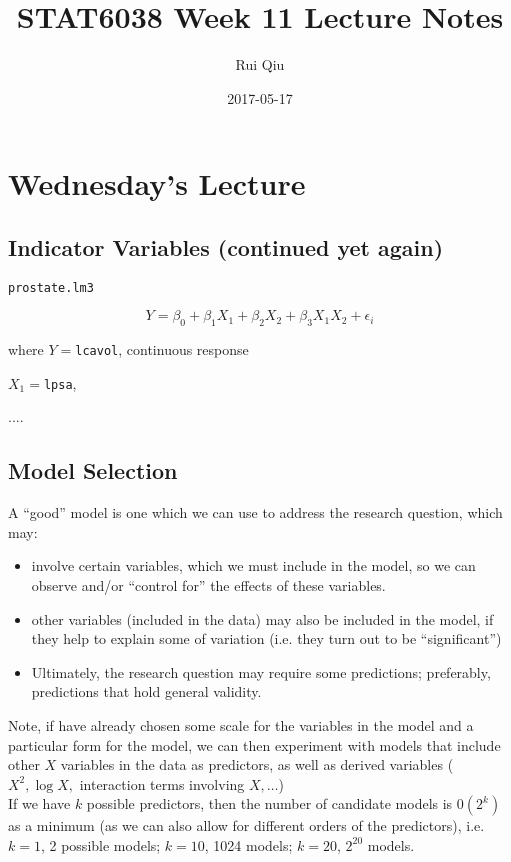 \documentclass[a4paper, 11pt, twoside]{article}
\begin{document}
\title{STAT6038 Week 11 Lecture Notes}
\author{Rui Qiu}
\date{2017-05-17}

\maketitle

\section{Wednesday's Lecture}
\subsection{Indicator Variables (continued yet again)}

\texttt{prostate.lm3}

\[Y=\beta_0+\beta_1X_1+\beta_2X_2+\beta_3X_1X_2+\epsilon_i\]

where $Y=$\texttt{lcavol}, continuous response

$X_1=$\texttt{lpsa}, 

....

\subsection{Model Selection}
A ``good'' model is one which we can use to address the research question, which may:

\begin{itemize}
	\item involve certain variables, which we must include in the model, so we can observe and/or ``control for'' the effects of these variables.
	\item other variables (included in the data) may also be included in the model, if they help to explain some of variation (i.e. they turn out to be ``significant'')
	\item Ultimately, the research question may require some predictions; preferably, predictions that hold general validity.
\end{itemize}

Note, if have already chosen some scale for the variables in the model and a particular form for the model, we can then experiment with models that include other $X$ variables in the data as predictors, as well as derived variables ($X^2,\log{X},$ interaction terms involving $X, \dots$)\\

If we have $k$ possible predictors, then the number of candidate models is $0(2^k)$ as a minimum (as we can also allow for different orders of the predictors), i.e. $k=1$, 2 possible models; $k=10$, 1024 models; $k=20$, $2^{20}$ models.\\
\end{document}
